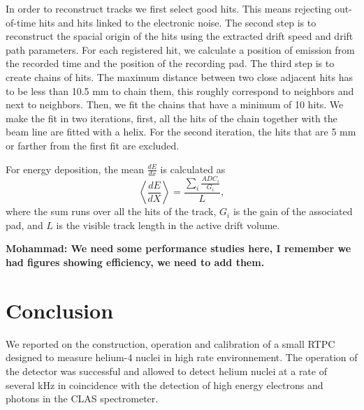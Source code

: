 \documentclass[twocolumn,showpacs,superscriptaddress,groupedaddress]{revtex4}
\begin{document}
In order to reconstruct tracks we first select good hits. This means rejecting 
out-of-time hits and hits linked to the electronic noise. The second step is 
to reconstruct the spacial origin of the hits using the extracted drift speed and drift path 
parameters. For each registered hit, we calculate a position of emission from 
the recorded time and the position of the recording pad. The third step 
is to create chains of hits. The maximum distance between two close adjacent 
hits has to be less than 10.5 mm to chain them, this roughly correspond to 
neighbors and next to neighbors. Then, we fit the chains that have a minimum of 
10 hits. We make the fit in two iterations, first, all the hits of the chain 
together with the beam line are fitted with a helix. For the second iteration, 
the hits that are 5 mm or farther from the first fit are excluded.

For energy deposition, the mean $\frac{dE}{dx}$ is calculated as
\begin{equation}
 \left\langle \frac{dE}{dX} \right\rangle= \frac{\sum\limits_{i} \frac{ADC_{i}}{G_i}}{L},
\end{equation}
where the sum runs over all the hits of the track, $G_{i}$ is the gain of 
the associated pad, and $L$ is the visible track length in the active drift 
volume. 

{\bf \color{red} Mohammad: We need some performance studies here, I remember we had
figures showing efficiency, we need to add them.}

\section{Conclusion}

We reported on the construction, operation and calibration of a small RTPC 
designed to measure helium-4 nuclei in high rate environnement. The operation
of the detector was successful and allowed to detect helium nuclei at a rate
of several kHz in coincidence with the detection of high energy electrons and 
photons in the CLAS spectrometer. 

  
\end{document}
